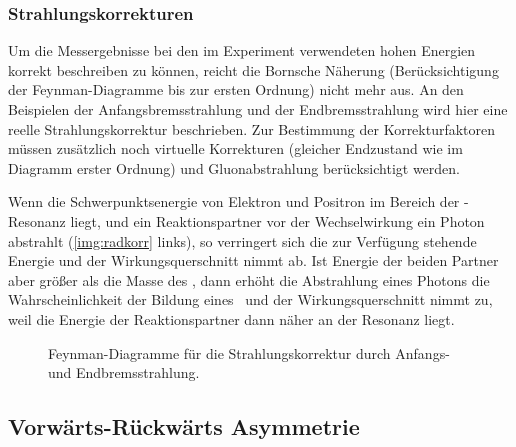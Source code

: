 \subsubsection*{Strahlungskorrekturen}
Um die Messergebnisse bei den im Experiment verwendeten hohen Energien korrekt beschreiben zu können,
reicht die Bornsche Näherung (Berücksichtigung der Feynman-Diagramme bis zur ersten Ordnung) nicht mehr aus.
An den Beispielen der Anfangsbremsstrahlung und der Endbremsstrahlung wird hier
eine reelle Strahlungskorrektur beschrieben.
Zur Bestimmung der Korrekturfaktoren müssen zusätzlich noch virtuelle Korrekturen (gleicher Endzustand
wie im Diagramm erster Ordnung) und Gluonabstrahlung berücksichtigt werden.

Wenn die Schwerpunktsenergie von Elektron und Positron im Bereich der \Z-Resonanz liegt,
und ein Reaktionspartner vor der Wechselwirkung ein Photon abstrahlt (\autoref{img:radkorr} links),
so verringert sich die zur Verfügung stehende Energie und der Wirkungsquerschnitt nimmt ab.
Ist Energie der beiden Partner aber größer als die Masse des \Z, dann erhöht die Abstrahlung
eines Photons die Wahrscheinlichkeit der Bildung eines \Z\ und der Wirkungsquerschnitt nimmt zu,
weil die Energie der Reaktionspartner dann
näher an der Resonanz liegt.

\begin{figure}[H]
        \centering
        \def\svgwidth{0.75\textwidth}
       
        \caption{Feynman-Diagramme für die Strahlungskorrektur durch Anfangs- und Endbremsstrahlung.}
        \label{img:radkorr}
\end{figure}

\subsection{Vorwärts-Rückwärts Asymmetrie}
